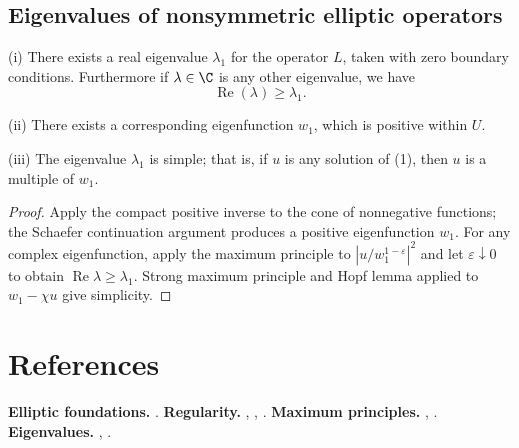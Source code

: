 \subsection{Eigenvalues of nonsymmetric elliptic operators}

\begin{theorem}
\label{thm:principal-eigenvalue-nonsymmetric-operator}
(i) There exists a real eigenvalue $\lambda_1$ for the operator $L$, taken with zero boundary conditions. Furthermore if $\lambda \in \C$ is any other eigenvalue, we have
$$\operatorname{Re}(\lambda) \geq \lambda_1.$$

(ii) There exists a corresponding eigenfunction $w_1$, which is positive within $U$.

(iii) The eigenvalue $\lambda_1$ is simple; that is, if $u$ is any solution of (1), then $u$ is a multiple of $w_1$.
\end{theorem}

\begin{proof}
\sketch Apply the compact positive inverse to the cone of nonnegative functions; the Schaefer continuation argument produces a positive eigenfunction $w_1$. For any complex eigenfunction, apply the maximum principle to $|u/w_1^{1-\varepsilon}|^2$ and let $\varepsilon\downarrow0$ to obtain $\operatorname{Re}\lambda\ge\lambda_1$. Strong maximum principle and Hopf lemma applied to $w_1-\chi u$ give simplicity.
\end{proof}

\section{References}
\label{sec:elliptic-references}
\textbf{Elliptic foundations.} \cite{GilbargTrudinger1983}.
\textbf{Regularity.} \cite{GilbargTrudinger1983}, \cite{Krylov1996}, \cite{LadyzhenskayaUraltseva1968}.
\textbf{Maximum principles.} \cite{GilbargTrudinger1983}, \cite{ProtterWeinberger1967}.
\textbf{Eigenvalues.} \cite{Smoller1983}, \cite{ProtterWeinberger1967}.
